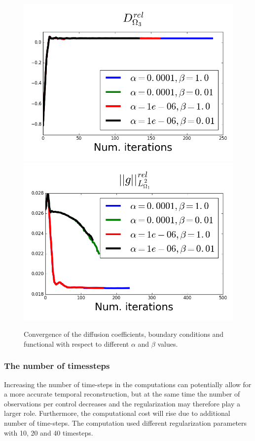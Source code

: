 \documentclass[11pt,a4paper]{article}
\begin{document}
\begin{figure}
\includegraphics[scale=0.2]{Convergence3}  
\includegraphics[scale=0.2]{Convergence4}  
\label{convergence}
\caption{Convergence of the diffusion coefficients, boundary conditions and functional with respect to different $\alpha$ and $\beta$ values. } 
\end{figure}

\subsubsection{The number of timessteps}
Increasing the number of time-steps in the computations can potentially allow for a more accurate temporal reconstruction, but at the same time the number of observations per control decreases and the regularization may therefore play a larger role. Furthermore, the computational cost will rise due to additional number of time-steps. 
The computation used different regularization parameters with 10, 20 and 40 timesteps. 
\end{document}
